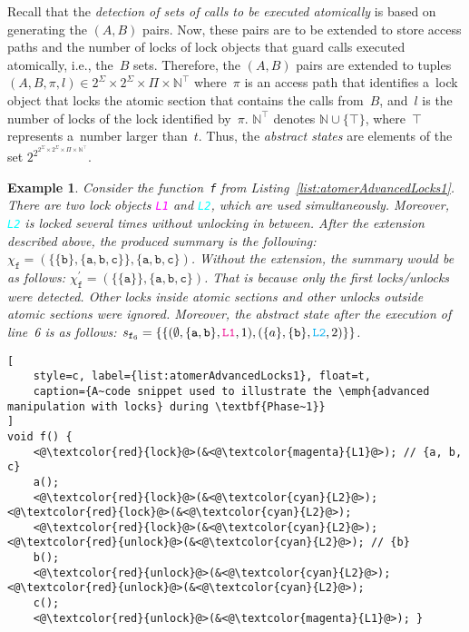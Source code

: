 \documentclass{ExcelAtFIT}
\theoremstyle{example}
\newtheorem{example}{Example}[section]
\begin{document}
Recall that the \emph{detection of sets of calls to be executed atomically} is based on generating the ${ (A, B) }$ pairs. Now, these pairs are to be extended to store access paths and the number of locks of lock objects that guard calls executed atomically, i.e., the~$ B $ sets. Therefore, the ${ (A, B) }$ pairs are extended to tuples $ (A, B, \pi, \allowbreak l) \in 2^\Sigma \times 2^\Sigma \times \Pi \times \mathbb{N}^\top $ where~$ \pi $ is an access path that identifies a~lock object that locks the atomic section that contains the calls from~$ B $, and~$ l $ is the number of locks of the lock identified by~$ \pi $. $ \mathbb{N}^\top $ denotes $ \mathbb{N} \cup \{\top\} $, where~$ \top $ represents a~number larger than~$ t $. Thus, the \emph{abstract states} are elements of the set $ 2^{2^{2^\Sigma \times 2^\Sigma \times \Pi \times \mathbb{N}^\top}} $.

\begin{example}
    Consider the function~\texttt{f} from Listing~\ref{list:atomerAdvancedLocks1}. There are two lock objects \textcolor{magenta}{\texttt{L1}} and \textcolor{cyan}{\texttt{L2}}, which are used simultaneously. Moreover, \textcolor{cyan}{\texttt{L2}} is locked several times without unlocking in between. After the extension described above, the produced \emph{summary} is the following: $ \chi_\mathtt{f} = ({\{\{\mathtt{b}\}, \{\mathtt{a}, \mathtt{b}, \mathtt{c}\}\}}, {\{\mathtt{a}, \mathtt{b}, \mathtt{c}\}}) $. Without the extension, the summary would be as follows: $ \chi_\mathtt{f}^\prime = ({\{\{\mathtt{a}\}\}}, {\{\mathtt{a}, \mathtt{b}, \mathtt{c}\}}) $. That is because only the first locks/unlocks were detected. Other locks inside atomic sections and other unlocks outside atomic sections were ignored. Moreover, the abstract state after the execution of line~6 is as follows: $ s_{\mathtt{f}_6} = \{\{{(\emptyset, \{\mathtt{a, b}\}, \textcolor{magenta}{\mathtt{L1}}, 1)}, \allowbreak {(\{a\}, \{\mathtt{b}\}, \textcolor{cyan}{\mathtt{L2}}, 2)}\}\} $.
\end{example}

\begin{lstlisting}[
    style=c, label={list:atomerAdvancedLocks1}, float=t,
    caption={A~code snippet used to illustrate the \emph{advanced manipulation with locks} during \textbf{Phase~1}}
]
void f() {
    <@\textcolor{red}{lock}@>(&<@\textcolor{magenta}{L1}@>); // {a, b, c}
    a();
    <@\textcolor{red}{lock}@>(&<@\textcolor{cyan}{L2}@>); <@\textcolor{red}{lock}@>(&<@\textcolor{cyan}{L2}@>);
    <@\textcolor{red}{lock}@>(&<@\textcolor{cyan}{L2}@>); <@\textcolor{red}{unlock}@>(&<@\textcolor{cyan}{L2}@>); // {b}
    b();
    <@\textcolor{red}{unlock}@>(&<@\textcolor{cyan}{L2}@>); <@\textcolor{red}{unlock}@>(&<@\textcolor{cyan}{L2}@>);
    c();
    <@\textcolor{red}{unlock}@>(&<@\textcolor{magenta}{L1}@>); }
\end{lstlisting}
\end{document}
